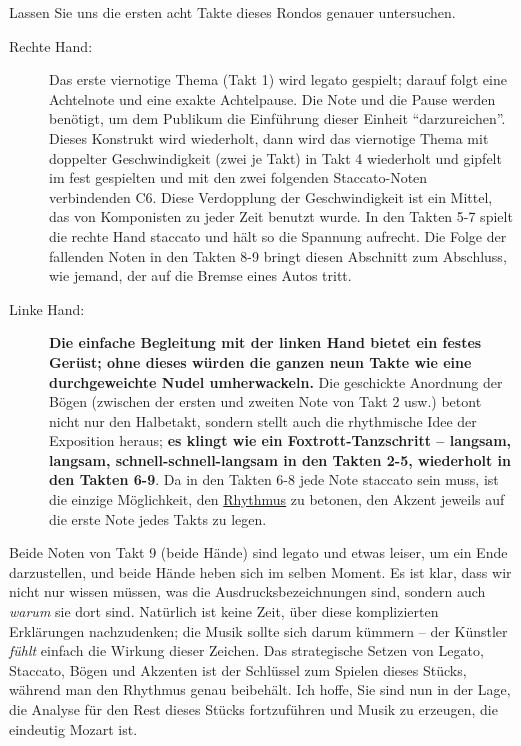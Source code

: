 Lassen Sie uns die ersten acht Takte dieses Rondos genauer untersuchen.
\begin{description}
 \item[Rechte Hand:] Das erste viernotige Thema (Takt 1) wird legato gespielt; darauf folgt eine Achtelnote und eine exakte Achtelpause.
Die Note und die Pause werden benötigt, um dem Publikum die Einführung dieser Einheit \enquote{darzureichen}.
Dieses Konstrukt wird wiederholt, dann wird das viernotige Thema mit doppelter Geschwindigkeit (zwei je Takt) in Takt 4 wiederholt und gipfelt im fest gespielten und mit den zwei folgenden Staccato-Noten verbindenden C6.
Diese Verdopplung der Geschwindigkeit ist ein Mittel, das von Komponisten zu jeder Zeit benutzt wurde.
In den Takten 5-7 spielt die rechte Hand staccato und hält so die Spannung aufrecht.
Die Folge der fallenden Noten in den Takten 8-9 bringt diesen Abschnitt zum Abschluss, wie jemand, der auf die Bremse eines Autos tritt.
 \item[Linke Hand:] \textbf{Die einfache Begleitung mit der linken Hand bietet ein festes Gerüst; ohne dieses würden die ganzen neun Takte wie eine durchgeweichte Nudel umherwackeln.}
Die geschickte Anordnung der Bögen (zwischen der ersten und zweiten Note von Takt 2 usw.) betont nicht nur den Halbetakt, sondern stellt auch die rhythmische Idee der Exposition heraus; \textbf{es klingt wie ein Foxtrott-Tanzschritt -- langsam, langsam, schnell-schnell-langsam in den Takten 2-5, wiederholt in den Takten 6-9}.
Da in den Takten 6-8 jede Note staccato sein muss, ist die einzige Möglichkeit, den \hyperref[c1iii1b]{Rhythmus} zu betonen, den Akzent jeweils auf die erste Note jedes Takts zu legen.
\end{description}

Beide Noten von Takt 9 (beide Hände) sind legato und etwas leiser, um ein Ende darzustellen, und beide Hände heben sich im selben Moment.
Es ist klar, dass wir nicht nur wissen müssen, was die Ausdrucksbezeichnungen sind, sondern auch \textit{warum} sie dort sind.
Natürlich ist keine Zeit, über diese komplizierten Erklärungen nachzudenken; die Musik sollte sich darum kümmern -- der Künstler \textit{fühlt} einfach die Wirkung dieser Zeichen.
Das strategische Setzen von Legato, Staccato, Bögen und Akzenten ist der Schlüssel zum Spielen dieses Stücks, während man den Rhythmus genau beibehält.
Ich hoffe, Sie sind nun in der Lage, die Analyse für den Rest dieses Stücks fortzuführen und Musik zu erzeugen, die eindeutig Mozart ist.

